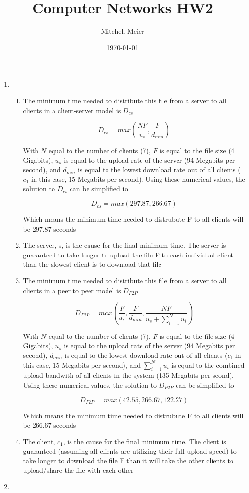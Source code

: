 \documentclass[14pt]{article}
\title{Computer Networks HW2}
\author{Mitchell Meier}
\date{\today}
\begin{document}
\maketitle

\begin{enumerate}

\item
\begin{enumerate}[(1)]
\item
The minimum time needed to distribute this file from a server to all clients in a client-server model is $D_{cs}$  

\[D_{cs} = max(\frac{NF}{u_s},\frac{F}{d_{min}})\]

With $N$ equal to the number of clients (7), $F$ is equal to the file size (4 Gigabits), $u_s$ is equal to the upload rate of the server (94 Megabits per second), and $d_{min}$ is equal to the lowest download rate out of all clients ($c_1$ in this case, 15 Megabits per second). Using these numerical values, the solution to $D_{cs}$ can be simplified to

\[D_{cs} = max(297.87,266.67)\]

Which means the minimum time needed to distrubute F to all clients will be 297.87 seconds \\

\item
The server, s, is the cause for the final minimum time. The server is guaranteed to take longer to upload the file F to each individual client than the slowest client is to download that file \\

\item
The minimum time needed to distribute this file from a server to all clients in a peer to peer model is $D_{P2P}$

\[D_{P2P} = max(\frac{F}{u_s},\frac{F}{d_{min}},\frac{NF}{u_s + \sum\limits_{i=1}^{N} u_i})\] 

With $N$ equal to the number of clients (7), $F$ is equal to the file size (4 Gigabits), $u_s$ is equal to the upload rate of the server (94 Megabits per second), $d_{min}$ is equal to the lowest download rate out of all clients ($c_1$ in this case, 15 Megabits per second), and $\sum_{i=1}^{N} u_i$ is equal to the combined upload bandwith of all clients in the system (135 Megabits per seond). Using these numerical values, the solution to $D_{P2P}$ can be simplified to 

\[D_{P2P} = max(42.55,266.67,122.27)\] 

Which means the minimum time needed to distrubute F to all clients will be 266.67 seconds \\

\item
The client, $c_1$, is the cause for the final minimum time. The client is guaranteed (assuming all clients are utilizing their full upload speed) to take longer to download the file F than it will take the other clients to upload/share the file with each other \\
\end{enumerate}

\item


\end{enumerate}
\end{document}
